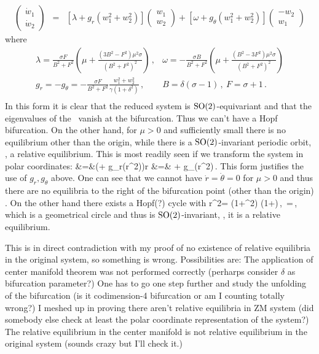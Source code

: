 \begin{eqnarray}
 \left(\begin{array}{c} \dot{w}_1 \\ \dot{w}_2  \end{array}\right) & = & \left[\lambda + g_r(w_1^2+w_2^2) \right]\left(\begin{array}{c} w_1 \\ w_2  \end{array}\right) + \left[\omega + g_\theta(w_1^2+w_2^2) \right] \left(\begin{array}{c} -w_2 \\ w_1 \end{array}\right)
\end{eqnarray}
where
\[\begin{array}{cc}
	\lambda = \frac{ \sigma F}{B^2+F^2} \left(\mu +\frac{\left(3 B^2-F^2\right) \mu ^2 \sigma }{\left(B^2+F^2\right)^2}\right)\,, &
		\omega = -\frac{ \sigma B}{B^2+F^2}\left(\mu +\frac{\left(B^2-3 F^2\right) \mu ^2 \sigma }{\left(B^2+F^2\right)^2}\right) \\
	g_r= -g_\theta= -\frac{ \sigma F}{B^2+F^2} \frac{w_1^2+w_2^2}{\gamma\left(1+\delta ^2\right)}\,,  & B = \delta(\sigma-1)\,,\ F=\sigma+1\,.  \\
\end{array}
\]
In this form it is clear that the reduced system is
$\textrm{SO}(2)$-equivariant and that the eigenvalues of the \stabmat\
vanish at the bifurcation. Thus we can't have a Hopf
bifurcation. On the other hand, for $\mu>0$ and sufficiently
small there is no equilibrium other than the origin, while
there is a $\textrm{SO}(2)$-invariant periodic orbit, \ie, a relative
equilibrium. This is most readily seen if we transform the
system in polar coordinates:
\bea
	 &=&\left(\lambda+ g_r(r^2)\right)r \continue
	\dot{\theta} &=& \omega+ g_\theta(r^2)\,.
\eea
This form justifies the use of $g_r,g_\theta$ above. One can see that we cannot have $\dot{r}=\dot{\theta}=0$ for $\mu>0$ and
thus there are no equilibria to the right of the bifurcation point (other than the origin) . On the other hand there exists a Hopf(?) cycle with
\beq
	r^2= \gamma  \left(1+\delta ^2\right) \mu  \left(1+\right)\,,\ \dot{\theta}=\,,
\eeq
which is a geometrical circle and thus is $\textrm{SO}(2)$-invariant, \ie, it is a relative equilibrium.

This is in direct contradiction with my proof of no existence of relative equilibria in the original system, so something
is wrong. Possibilities are: The application of center manifold theorem was not performed correctly (perharps consider $\delta$
as bifurcation parameter?) One has to go one step further and study the unfolding of the bifurcation (is it codimension-4 bifurcation
or am I counting totally wrong?) I meshed up in proving there aren't relative equilibria in ZM system (did somebody else check at least the polar coordinate representation of the system?) The relative equilibrium in the center manifold is not relative equilibrium in
the original system (sounds crazy but I'll check it.)

